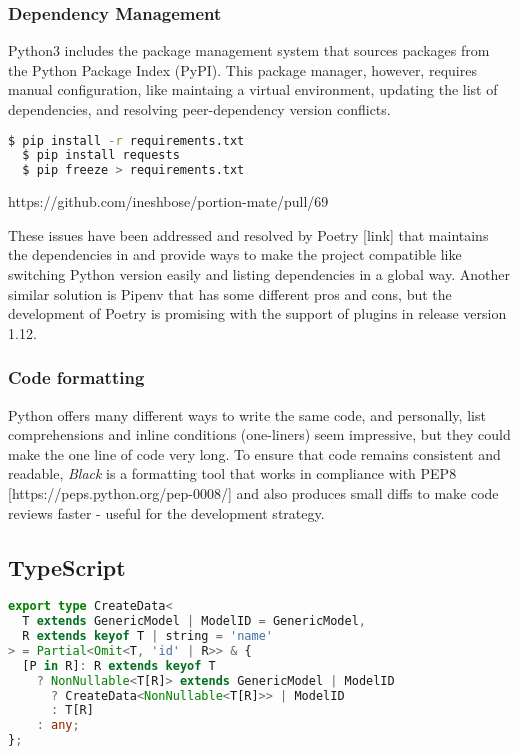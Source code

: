 \documentclass{l4proj}
\begin{document}
\subsubsection{Dependency Management}

Python3 includes the  package management system that sources packages from the Python Package Index (PyPI). This package manager, however, requires manual configuration, like maintaing a virtual environment, updating the list of dependencies, and resolving peer-dependency version conflicts.

\begin{lstlisting}[language=bash, caption={\code{pip} usage example}]
  $ pip install -r requirements.txt
  $ pip install requests
  $ pip freeze > requirements.txt
\end{lstlisting}

https://github.com/ineshbose/portion-mate/pull/69

These issues have been addressed and resolved by Poetry [link] that maintains the dependencies in  and provide ways to make the project compatible like switching Python version easily and listing dependencies in a global way. Another similar solution is Pipenv that has some different pros and cons, but the development of Poetry is promising with the support of plugins in release version 1.12.

\subsubsection{Code formatting}

Python offers many different ways to write the same code, and personally, list comprehensions and inline conditions (one-liners) seem impressive, but they could make the one line of code very long. To ensure that code remains consistent and readable, \textit{Black} is a formatting tool that works in compliance with PEP8 [https://peps.python.org/pep-0008/] and also produces small diffs to make code reviews faster - useful for the development strategy.

\subsection{TypeScript}

\begin{lstlisting}[language=typescript, caption={type definition for creation object in \href{https://github.com/ineshbose/portion-mate/blob/c51ee3f32d05df641157467169e9659732202b7b/src/app/types/api.ts\#L28}{\code{./src/app/types/api.ts}}}]
export type CreateData<
  T extends GenericModel | ModelID = GenericModel,
  R extends keyof T | string = 'name'
> = Partial<Omit<T, 'id' | R>> & {
  [P in R]: R extends keyof T
    ? NonNullable<T[R]> extends GenericModel | ModelID
      ? CreateData<NonNullable<T[R]>> | ModelID
      : T[R]
    : any;
};
\end{lstlisting}
\end{document}
